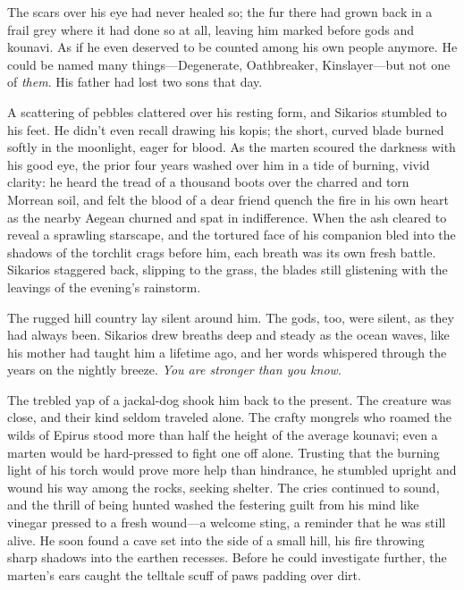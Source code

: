 The scars over his eye had never healed so; the fur there had grown back in a frail grey where it had done so at all, leaving him marked before gods and kounavi. As if he even deserved to be counted among his own people anymore. He could be named many things---Degenerate, Oathbreaker, Kinslayer---but not one of \emph{them}. His father had lost two sons that day.

A scattering of pebbles clattered over his resting form, and Sikarios stumbled to his feet. He didn't even recall drawing his kopis; the short, curved blade burned softly in the moonlight, eager for blood. As the marten scoured the darkness with his good eye, the prior four years washed over him in a tide of burning, vivid clarity: he heard the tread of a thousand boots over the charred and torn Morrean soil, and felt the blood of a dear friend quench the fire in his own heart as the nearby Aegean churned and spat in indifference. When the ash cleared to reveal a sprawling starscape, and the tortured face of his companion bled into the shadows of the torchlit crags before him, each breath was its own fresh battle. Sikarios staggered back, slipping to the grass, the blades still glistening with the leavings of the evening's rainstorm.

The rugged hill country lay silent around him. The gods, too, were silent, as they had always been. Sikarios drew breaths deep and steady as the ocean waves, like his mother had taught him a lifetime ago, and her words whispered through the years on the nightly breeze. \emph{You are stronger than you know}.

The trebled yap of a jackal-dog shook him back to the present. The creature was close, and their kind seldom traveled alone. The crafty mongrels who roamed the wilds of Epirus stood more than half the height of the average kounavi; even a marten would be hard-pressed to fight one off alone. Trusting that the burning light of his torch would prove more help than hindrance, he stumbled upright and wound his way among the rocks, seeking shelter. The cries continued to sound, and the thrill of being hunted washed the festering guilt from his mind like vinegar pressed to a fresh wound---a welcome sting, a reminder that he was still alive. He soon found a cave set into the side of a small hill, his fire throwing sharp shadows into the earthen recesses. Before he could investigate further, the marten's ears caught the telltale scuff of paws padding over dirt.

